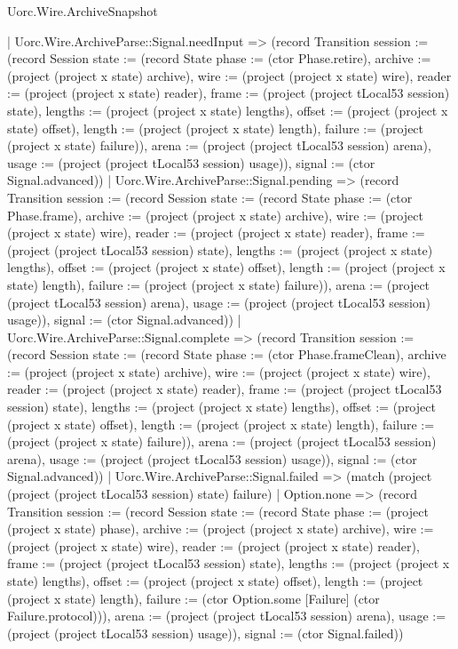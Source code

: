 \begin{lexlean}{Uorc.Wire.ArchiveSnapshot}
\begin{semanticmodule}
{        | Uorc.Wire.ArchiveParse::Signal.needInput => (record Transition {session := (record Session {state := (record State {phase := (ctor Phase.retire), archive := (project (project x state) archive), wire := (project (project x state) wire), reader := (project (project x state) reader), frame := (project (project tLocal53 session) state), lengths := (project (project x state) lengths), offset := (project (project x state) offset), length := (project (project x state) length), failure := (project (project x state) failure)}), arena := (project (project tLocal53 session) arena), usage := (project (project tLocal53 session) usage)}), signal := (ctor Signal.advanced)})
        | Uorc.Wire.ArchiveParse::Signal.pending => (record Transition {session := (record Session {state := (record State {phase := (ctor Phase.frame), archive := (project (project x state) archive), wire := (project (project x state) wire), reader := (project (project x state) reader), frame := (project (project tLocal53 session) state), lengths := (project (project x state) lengths), offset := (project (project x state) offset), length := (project (project x state) length), failure := (project (project x state) failure)}), arena := (project (project tLocal53 session) arena), usage := (project (project tLocal53 session) usage)}), signal := (ctor Signal.advanced)})
        | Uorc.Wire.ArchiveParse::Signal.complete => (record Transition {session := (record Session {state := (record State {phase := (ctor Phase.frameClean), archive := (project (project x state) archive), wire := (project (project x state) wire), reader := (project (project x state) reader), frame := (project (project tLocal53 session) state), lengths := (project (project x state) lengths), offset := (project (project x state) offset), length := (project (project x state) length), failure := (project (project x state) failure)}), arena := (project (project tLocal53 session) arena), usage := (project (project tLocal53 session) usage)}), signal := (ctor Signal.advanced)})
        | Uorc.Wire.ArchiveParse::Signal.failed => (match (project (project (project tLocal53 session) state) failure)
          | Option.none => (record Transition {session := (record Session {state := (record State {phase := (project (project x state) phase), archive := (project (project x state) archive), wire := (project (project x state) wire), reader := (project (project x state) reader), frame := (project (project tLocal53 session) state), lengths := (project (project x state) lengths), offset := (project (project x state) offset), length := (project (project x state) length), failure := (ctor Option.some [Failure] (ctor Failure.protocol))}), arena := (project (project tLocal53 session) arena), usage := (project (project tLocal53 session) usage)}), signal := (ctor Signal.failed)})
}
\end{semanticmodule}
\end{lexlean}
